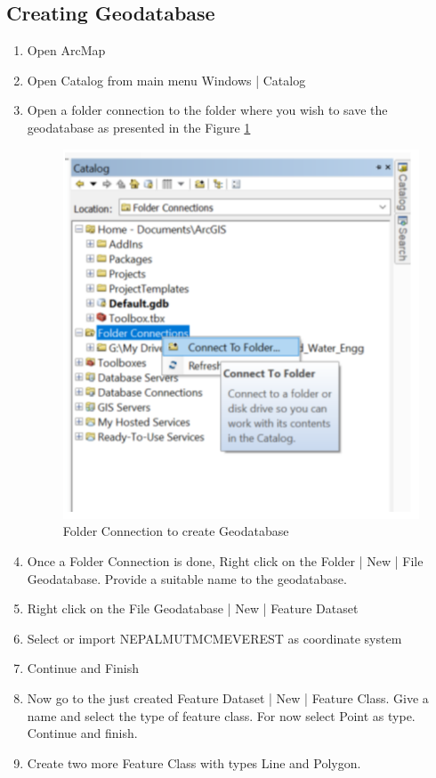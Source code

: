 \subsection{Creating Geodatabase}
\begin{enumerate}
\item{Open ArcMap}
\item{Open Catalog from main menu Windows | Catalog}
\item{Open a folder connection to the folder where you wish to save the geodatabase as presented in the Figure \ref{fig:geodatabase_folder_connection}}
	\begin{figure}[h]
	\centering
	\label{fig:geodatabase_folder_connection}
	\includegraphics[scale=0.5]{images/geodatabase_folder_connection}
	\caption{Folder Connection to create Geodatabase}
	\label{fig:geodatabase_folder_connection}
	\end{figure}
\item{Once a Folder Connection is done, Right click on the Folder | New | File Geodatabase. Provide a suitable name to the geodatabase.}
\item Right click on the File Geodatabase | New | Feature Dataset
\item Select or import NEPAL\textunderscore MUTM\textunderscore CM\textunderscore EVEREST as coordinate system
\item Continue and Finish
\item Now go to the just created Feature Dataset | New | Feature
Class. Give a name and select the type of feature class. For now
select Point as type. Continue and finish.
\item Create two more Feature Class with types Line and Polygon.
\end{enumerate}

